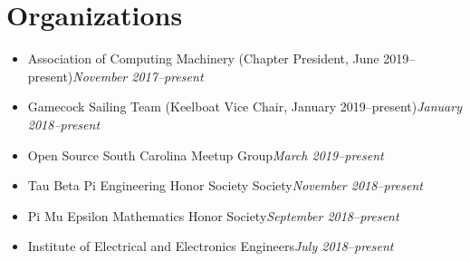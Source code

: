 \documentclass[\ifdefined\cv11pt\else10pt\fi,letterpaper,roman]{moderncv}
\newcommand{\cvonly}[1]{\ifdefined\cv#1\fi}
\renewcommand{\cvitem}[2]{\item {#1}\hfill\textit{#2}}
\let\oldsection\section
\renewcommand{\section}[1]{\vspace*{-1.3ex}\oldsection{#1}\vspace*{-0.5ex}}
\begin{document}
\section{\textbf{Organizations}}
\begin{itemize}
	\cvitem{Association of Computing Machinery (Chapter President, June 2019--present)}{November 2017--present}
	\cvitem{Gamecock Sailing Team (Keelboat Vice Chair, January 2019--present)}{January 2018--present}
	\cvitem{Open Source South Carolina Meetup Group}{March 2019--present}
	\cvitem{Tau Beta Pi Engineering Honor Society Society}{November 2018--present}
	\cvitem{Pi Mu Epsilon Mathematics Honor Society}{September 2018--present}
	\cvitem{Institute of Electrical and Electronics Engineers}{July 2018--present}
\end{itemize}

\setlength{\premulticols}{0pt}
\end{document}
